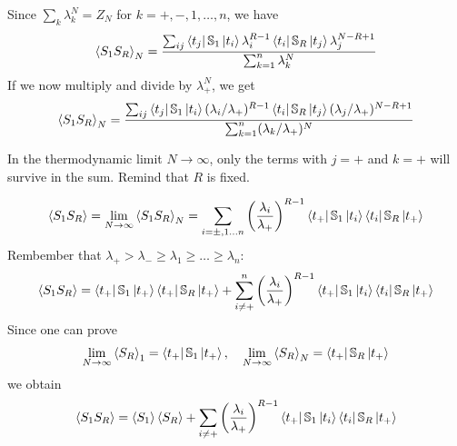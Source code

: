 \documentclass[../../Main/Main.tex]{subfiles}
\begin{document}
\noindent Since \( \sum_{k}^{} \lambda _k^N = Z_N \) for \( k=+,-,1,\dots,n \), we have
\begin{equation*}
  \expval{S_1 S_R}_N = \frac{\sum_{ij}^{} \bra{t_j} \mathbb{S}_1 \ket{t_i} \lambda _i^{R-1} \bra{t_i} \mathbb{S}_R \ket{t_j} \lambda _j^{N-R+1}      }{\sum_{k=1}^{n} \lambda _k^N  }
\end{equation*}
If we now multiply and divide by \( \lambda _+^N \), we get
\begin{equation*}
  \expval{S_1 S_R}_N = \frac{\sum_{ij}^{} \bra{t_j} \mathbb{S}_1 \ket{t_i} (\lambda _i/ \lambda _+)^{R-1}  \bra{t_i} \mathbb{S}_R \ket{t_j} (\lambda _j / \lambda _+)^{N-R+1}    }{\sum_{k=1}^{n} (\lambda _k  / \lambda _+)^{N} }
\end{equation*}
\begin{remark}
In the thermodynamic limit \( N \rightarrow \infty  \), only the terms with \( j=+ \) and \( k=+ \) will survive in the sum. Remind that \( R \) is fixed.
\end{remark}
\begin{equation*}
\expval{S_1 S_R} =   \lim_{N \rightarrow \infty } \expval{S_1 S_R}_N = \sum_{i= \pm,1 \dots n}^{} \qty(\frac{\lambda _i}{\lambda _+})^{R-1} \bra{t_+} \mathbb{S}_1 \ket{t_i} \bra{t_i} \mathbb{S}_R \ket{t_+}
\end{equation*}
Rembember that \( \lambda _+ > \lambda _- \ge \lambda _1 \ge \dots \ge \lambda _n \):
\begin{equation*}
  \expval{S_1 S_R} = \bra{t_+} \mathbb{S}_1 \ket{t_+} \bra{t_+} \mathbb{S}_R \ket{t_+} +   \sum_{i \neq +}^{n} \qty(\frac{\lambda _i}{\lambda _+})^{R-1} \bra{t_+} \mathbb{S}_1 \ket{t_i} \bra{t_i} \mathbb{S}_R \ket{t_+}
\end{equation*}
Since one can prove 
\begin{equation}
  \lim_{N \rightarrow \infty } \expval{S_R}_1 = \bra{t_+} \mathbb{S}_1 \ket{t_+} , \quad \lim_{N \rightarrow \infty } \expval{S_R}_N = \bra{t_+} \mathbb{S}_R \ket{t_+}
  \label{eq:8_3}
\end{equation}
we obtain
\begin{equation}
  \expval{S_1 S_R} = \expval{S_1} \expval{S_R} + \sum_{i \neq +}^{}  \qty(\frac{\lambda _i}{\lambda _+})^{R-1} \bra{t_+} \mathbb{S}_1 \ket{t_i} \bra{t_i} \mathbb{S}_R \ket{t_+}
  \label{eq:8_2}
\end{equation}
\end{document}
